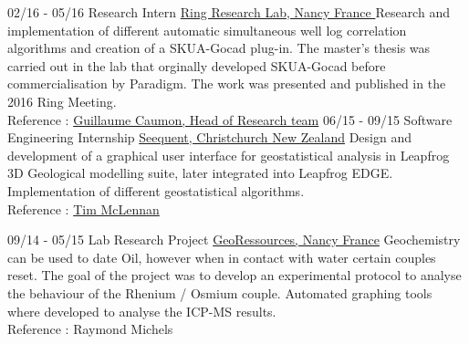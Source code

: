 \documentclass[]{friggeri-cv}
\begin{document}
    \vspace*{\fill}
    \begin{entrylist}
    \entry
    {02/16 - 05/16}
    {Research Intern}
    {\href{http://www.ring-team.org/}{Ring Research Lab, Nancy France }}
    {Research and implementation of different automatic simultaneous well log correlation algorithms and creation of a SKUA-Gocad plug-in. The master's thesis was carried out in the lab that orginally developed SKUA-Gocad before commercialisation by Paradigm. The work was presented and published in the 2016 Ring Meeting. \\Reference : \href{mailto:Guillaume.Caumon@ensg.univ-lorraine.fr}{Guillaume Caumon, Head of Research team}}
    \entry
    {06/15 - 09/15}
    {Software Engineering Internship}
    {\href{https://www.seequent.com/}{Seequent, Christchurch New Zealand}}
    {Design and development of a graphical user interface for geostatistical analysis in Leapfrog 3D Geological modelling suite, later integrated into Leapfrog EDGE. Implementation of different geostatistical algorithms.
    \\
    Reference : \href{mailto:tim.mclennan@seequent.com}{Tim McLennan}}

	\entry
	{09/14 - 05/15}
	{Lab Research Project}
	{\href{http://georessources.univ-lorraine.fr/}{GeoRessources, Nancy France}}
	{Geochemistry can be used to date Oil, however when in contact with water certain couples reset. The goal of the project was to develop an experimental protocol to analyse the behaviour of the Rhenium / Osmium couple. Automated graphing tools where developed to analyse the ICP-MS results.
		\\
		Reference : Raymond Michels}
\end{entrylist}
\end{document}
